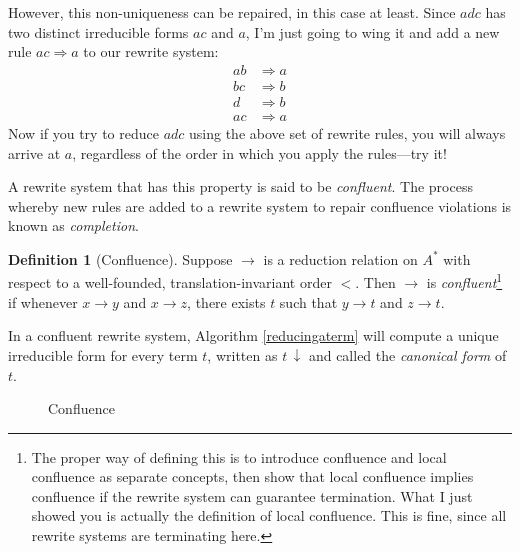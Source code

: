 \documentclass[headsepline,bibliography=totoc]{scrreport}
\theoremstyle{definition}
\theoremstyle{definition}
\newtheorem{definition}{Definition}[chapter]
\theoremstyle{definition}
\begin{document}
However, this non-uniqueness can be repaired, in this case at least. Since $adc$ has two distinct irreducible forms $ac$ and $a$, I'm just going to wing it and add a new rule $ac\Rightarrow a$ to our rewrite system:
\setcounter{equation}{0}
\begin{align}
ab&\Rightarrow a\tag{1}\\
bc&\Rightarrow b\tag{2}\\
d&\Rightarrow b\tag{3}\\
ac&\Rightarrow a\tag{4}
\end{align}
Now if you try to reduce $adc$ using the above set of rewrite rules, you will always arrive at $a$, regardless of the order in which you apply the rules---try it!

A rewrite system that has this property is said to be \emph{confluent}. The process whereby new rules are added to a rewrite system to repair confluence violations is known as \emph{completion}.

\begin{definition}[Confluence]
Suppose $\rightarrow$ is a reduction relation on $A^*$ with respect to a well-founded, translation-invariant order $<$. Then $\rightarrow$ is \emph{confluent}\footnote{The proper way of defining this is to introduce confluence and local confluence as separate concepts, then show that local confluence implies confluence if the rewrite system can guarantee termination. What I just showed you is actually the definition of local confluence. This is fine, since all rewrite systems are terminating here.} if whenever $x\rightarrow y$ and $x\rightarrow z$, there exists $t$ such that $y\rightarrow t$ and $z\rightarrow t$.

In a confluent rewrite system, Algorithm \ref{reducingaterm} will compute a unique irreducible form for every term $t$, written as $t\,{\downarrow}$ and called the \emph{canonical form} of $t$.
\begin{figure}\caption{Confluence}
\begin{center}
\end{center}
\end{figure}
\end{definition}
\end{document}
